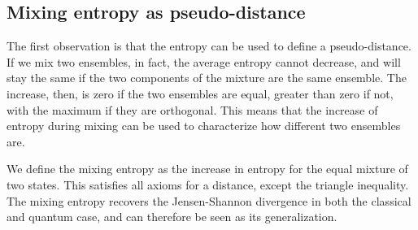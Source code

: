 \subsection{Mixing entropy as pseudo-distance}

The first observation is that the entropy can be used to define a pseudo-distance. If we mix two ensembles, in fact, the average entropy cannot decrease, and will stay the same if the two components of the mixture are the same ensemble. The increase, then, is zero if the two ensembles are equal, greater than zero if not, with the maximum if they are orthogonal. This means that the increase of entropy during mixing can be used to characterize how different two ensembles are.

We define the mixing entropy as the increase in entropy for the equal mixture of two states. This satisfies all axioms for a distance, except the triangle inequality. The mixing entropy recovers the Jensen-Shannon divergence in both the classical and quantum case, and can therefore be seen as its generalization.

